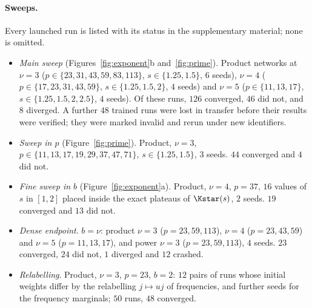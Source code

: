\paragraph{Sweeps.} Every launched run is listed with its status in the supplementary material; none is omitted.
\begin{itemize}
\item \emph{Main sweep} (Figures~\ref{fig:exponent}b and~\ref{fig:prime}). Product networks at $\nu=3$ ($p\in\{23,31,43,59,83,113\}$, $s\in\{1.25,1.5\}$, $6$ seeds), $\nu=4$ ($p\in\{17,23,31,43,59\}$, $s\in\{1.25,1.5,2\}$, $4$ seeds) and $\nu=5$ ($p\in\{11,13,17\}$, $s\in\{1.25,1.5,2,2.5\}$, $4$ seeds). Of these runs, $126$ converged, $46$ did not, and $8$ diverged. A further $48$ trained runs were lost in transfer before their results were verified; they were marked invalid and rerun under new identifiers.
\item \emph{Sweep in $p$} (Figure~\ref{fig:prime}). Product, $\nu=3$, $p\in\{11,13,17,19,29,37,47,71\}$, $s\in\{1.25,1.5\}$, $3$ seeds. $44$ converged and $4$ did not.
\item \emph{Fine sweep in $b$} (Figure~\ref{fig:exponent}a). Product, $\nu=4$, $p=37$, $16$ values of $s$ in $[1,2]$ placed inside the exact plateaus of $\Kstar(s)$, $2$ seeds. $19$ converged and $13$ did not.
\item \emph{Dense endpoint}. $b=\nu$: product $\nu=3$ ($p=23,59,113$), $\nu=4$ ($p=23,43,59$) and $\nu=5$ ($p=11,13,17$), and power $\nu=3$ ($p=23,59,113$), $4$ seeds. $23$ converged, $24$ did not, $1$ diverged and $12$ crashed.
\item \emph{Relabelling}. Product, $\nu=3$, $p=23$, $b=2$: $12$ pairs of runs whose initial weights differ by the relabelling $j\mapsto uj$ of frequencies, and further seeds for the frequency marginals; $50$ runs, $48$ converged.
\end{itemize}

